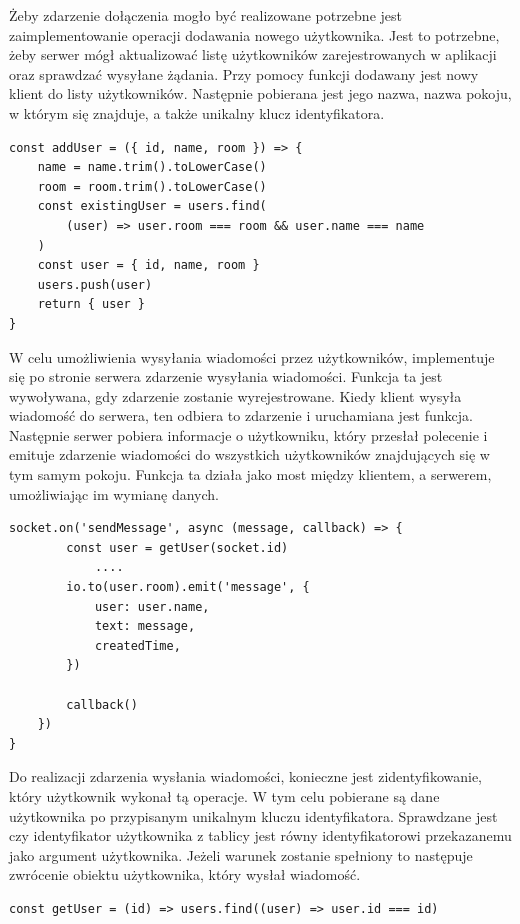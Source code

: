 Żeby zdarzenie dołączenia mogło być realizowane potrzebne jest zaimplementowanie operacji dodawania nowego użytkownika. Jest to potrzebne, żeby serwer mógł aktualizować listę użytkowników zarejestrowanych w aplikacji oraz sprawdzać wysyłane żądania. Przy pomocy funkcji dodawany jest nowy klient do listy użytkowników. Następnie pobierana jest jego nazwa, nazwa pokoju, w którym się znajduje, a także unikalny klucz identyfikatora.
\begin{lstlisting}[caption=Implementacja funkcji dodawania uzytkownika]
const addUser = ({ id, name, room }) => {
    name = name.trim().toLowerCase()
    room = room.trim().toLowerCase()
    const existingUser = users.find(
        (user) => user.room === room && user.name === name
    )
    const user = { id, name, room }
    users.push(user)
    return { user }
}
\end{lstlisting}
W celu umożliwienia wysyłania wiadomości przez użytkowników, implementuje się po stronie serwera zdarzenie wysyłania wiadomości. Funkcja ta jest wywoływana, gdy zdarzenie zostanie wyrejestrowane. Kiedy klient wysyła wiadomość do serwera, ten odbiera to zdarzenie i uruchamiana jest funkcja. Następnie serwer pobiera informacje o użytkowniku, który przesłał polecenie i emituje zdarzenie wiadomości do wszystkich użytkowników znajdujących się w tym samym pokoju. Funkcja ta działa jako most między klientem, a serwerem, umożliwiając im wymianę danych.
\begin{lstlisting}[caption=Implementacja zdarzenia wysylania wiadomosci]
socket.on('sendMessage', async (message, callback) => {
        const user = getUser(socket.id)
        	....
        io.to(user.room).emit('message', {
            user: user.name,
            text: message,
            createdTime,
        })

        callback()
    })
}
\end{lstlisting}
Do realizacji zdarzenia wysłania wiadomości, konieczne jest zidentyfikowanie, który użytkownik wykonał tą operacje. W tym celu pobierane są dane użytkownika po przypisanym unikalnym kluczu identyfikatora. Sprawdzane jest czy identyfikator użytkownika z tablicy jest równy identyfikatorowi przekazanemu jako argument użytkownika. Jeżeli warunek zostanie spełniony to następuje zwrócenie obiektu użytkownika, który wysłał wiadomość.
\begin{lstlisting}[caption=Implementacja funkcji pobierania informacji o uzytkowniku]
const getUser = (id) => users.find((user) => user.id === id)
\end{lstlisting}

